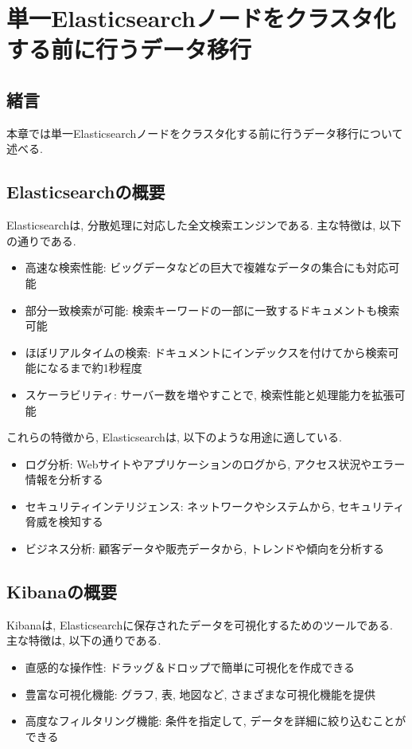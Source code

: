 
\chapter{単一Elasticsearchノードをクラスタ化する前に行うデータ移行}
\label{chap:third}

\section{緒言}
本章では単一Elasticsearchノードをクラスタ化する前に行うデータ移行について述べる.

\section{Elasticsearchの概要}
Elasticsearchは, 分散処理に対応した全文検索エンジンである. 主な特徴は, 以下の通りである.

\begin{itemize}
  \item 高速な検索性能: ビッグデータなどの巨大で複雑なデータの集合にも対応可能
  \item 部分一致検索が可能: 検索キーワードの一部に一致するドキュメントも検索可能
  \item ほぼリアルタイムの検索: ドキュメントにインデックスを付けてから検索可能になるまで約1秒程度
  \item スケーラビリティ: サーバー数を増やすことで, 検索性能と処理能力を拡張可能
\end{itemize}

これらの特徴から, Elasticsearchは, 以下のような用途に適している.

\begin{itemize}
  \item ログ分析: Webサイトやアプリケーションのログから, アクセス状況やエラー情報を分析する
  \item セキュリティインテリジェンス: ネットワークやシステムから, セキュリティ脅威を検知する
  \item ビジネス分析: 顧客データや販売データから, トレンドや傾向を分析する
\end{itemize}

\section{Kibanaの概要}

Kibanaは, Elasticsearchに保存されたデータを可視化するためのツールである. 主な特徴は, 以下の通りである.

\begin{itemize}
  \item 直感的な操作性: ドラッグ＆ドロップで簡単に可視化を作成できる
  \item 豊富な可視化機能: グラフ, 表, 地図など, さまざまな可視化機能を提供
  \item 高度なフィルタリング機能: 条件を指定して, データを詳細に絞り込むことができる
\end{itemize}

